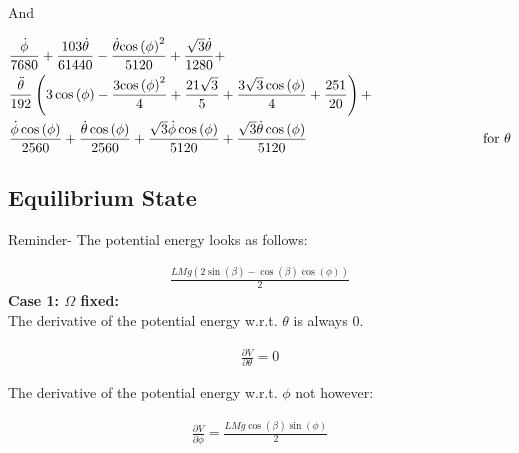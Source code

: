 And

\begin{equation}
    \begin{split}
        &\frac{\mathrm{\dot\phi}}{7680}+\frac{103\mathrm{\dot\theta}}{61440}-\frac{\mathrm{\dot\theta}{\cos\left(\phi \right)}^2}{5120}+\frac{\sqrt{3}\mathrm{\dot\theta}}{1280}+\\
        &\frac{\mathrm{\ddot\theta}}{192}\left(3\cos\left(\phi \right)-\frac{3{\cos\left(\phi \right)}^2}{4}+\frac{21\sqrt{3}}{5}+\frac{3\sqrt{3}\cos\left(\phi \right)}{4}+\frac{251}{20}\right)+\\
        &\frac{\mathrm{\dot\phi}\cos\left(\phi \right)}{2560}+\frac{\mathrm{\dot\theta}\cos\left(\phi \right)}{2560}+\frac{\sqrt{3}\mathrm{\dot\phi}\cos\left(\phi \right)}{5120}+\frac{\sqrt{3}\mathrm{\dot\theta}\cos\left(\phi \right)}{5120}\hspace{45mm}\text{for } \theta
    \end{split}
\end{equation}

\subsection{Equilibrium State}

Reminder- The potential energy looks as follows:

\begin{equation}
    \begin{split}
        \frac{LMg\left(2\sin\left(\beta \right)-\cos\left(\beta \right)\cos\left(\phi \right)\right)}{2}
    \end{split}
\end{equation}
\textbf{Case 1: $\Omega$ fixed:} \vspace{0.5cm}\\

The derivative of the potential energy w.r.t. $\theta$ is always 0.

\begin{equation}
    \begin{split}
        \frac{\partial V}{\partial \theta} = 0
    \end{split}
\end{equation}

The derivative of the potential energy w.r.t. $\phi$ not however:

\begin{equation}
    \begin{split}
        \frac{\partial V}{\partial \phi} = \frac{LMg\cos\left(\beta \right)\sin\left(\phi \right)}{2}
    \end{split}
\end{equation}

